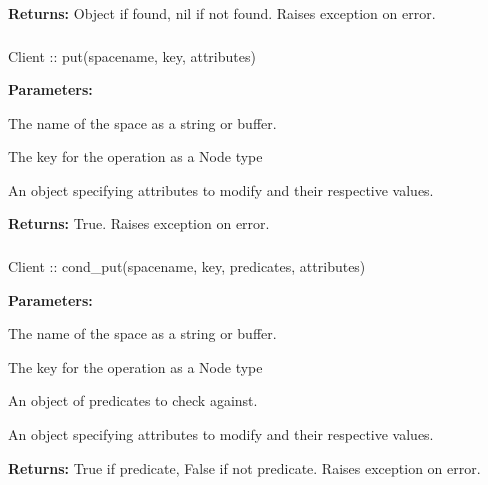 \noindent\textbf{Returns:}
Object if found, nil if not found.  Raises exception on error.

\subsubsection{}
\label{api:nodejs:put}
\begin{javascriptcode}
Client :: put(spacename, key, attributes)
\end{javascriptcode}


\noindent\textbf{Parameters:}
\begin{description}[labelindent=\widthof{{\code{attributes}}},leftmargin=*,noitemsep,nolistsep,align=right]
\item[\code{spacename}] The name of the space as a string or buffer.
\item[\code{key}] The key for the operation as a Node type
\item[\code{attributes}] An object specifying attributes to modify and their respective values.
\end{description}

\noindent\textbf{Returns:}
True.  Raises exception on error.

\subsubsection{}
\label{api:nodejs:cond_put}
\begin{javascriptcode}
Client :: cond_put(spacename, key, predicates, attributes)
\end{javascriptcode}


\noindent\textbf{Parameters:}
\begin{description}[labelindent=\widthof{{\code{predicates}}},leftmargin=*,noitemsep,nolistsep,align=right]
\item[\code{spacename}] The name of the space as a string or buffer.
\item[\code{key}] The key for the operation as a Node type
\item[\code{predicates}] An object of predicates to check against.
\item[\code{attributes}] An object specifying attributes to modify and their respective values.
\end{description}

\noindent\textbf{Returns:}
True if predicate, False if not predicate.  Raises exception on error.


